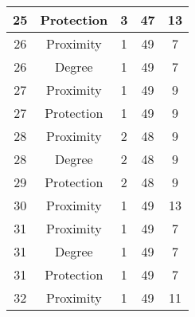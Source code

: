 \documentclass[results.tex]{subfiles}
\begin{document}
\begin{center}
\begin{tabular}{| c || c | c | c | c |}
            \hline
            25                      & Protection                   & 3                      & 47                      & 13                   \\
            \hline
            26                      & Proximity                    & 1                      & 49                      & 7                    \\
            \hline
            26                      & Degree                       & 1                      & 49                      & 7                    \\
            \hline
            27                      & Proximity                    & 1                      & 49                      & 9                    \\
            \hline
            27                      & Protection                   & 1                      & 49                      & 9                    \\
            \hline
            28                      & Proximity                    & 2                      & 48                      & 9                    \\
            \hline
            28                      & Degree                       & 2                      & 48                      & 9                    \\
            \hline
            29                      & Protection                   & 2                      & 48                      & 9                    \\
            \hline
            30                      & Proximity                    & 1                      & 49                      & 13                   \\
            \hline
            31                      & Proximity                    & 1                      & 49                      & 7                    \\
            \hline
            31                      & Degree                       & 1                      & 49                      & 7                    \\
            \hline
            31                      & Protection                   & 1                      & 49                      & 7                    \\
            \hline
            32                      & Proximity                    & 1                      & 49                      & 11                   \\

\end{tabular}
\end{center}
\end{document}
